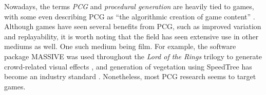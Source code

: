 Nowadays, the terms \textit{PCG} and \textit{procedural generation} are heavily tied to games, with some even describing PCG as ``the algorithmic creation of game content'' \cite[p.1]{pcg_in_games}.
Although games have seen several benefits from PCG, such as improved variation and replayability, it is worth noting that the field has seen extensive use in other mediums as well.
One such medium being film.
For example, the software package MASSIVE was used throughout the \textit{Lord of the Rings} trilogy to generate crowd-related visual effects \cite{massive}, and generation of vegetation using SpeedTree has become an industry standard \cite{speedtree_cinema}.
Nonetheless, most PCG research seems to target games.
